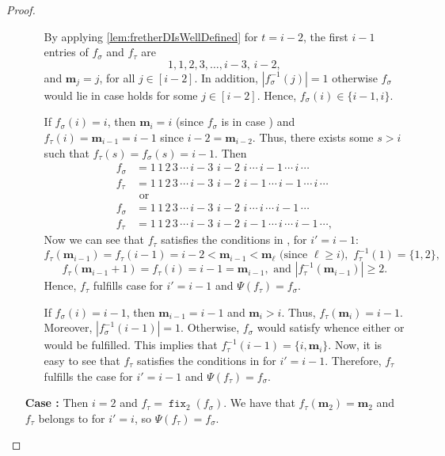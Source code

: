 \documentclass[reqno]{amsart}
\theoremstyle{definition}
\newcommand{\fretherD}{\Psi}
\newcommand{\img}{\mathbf{m}}
\DeclareMathOperator{\fixMap}{\mathtt{fix}}
\begin{document}
\begin{proof}
\begin{enumerate}[leftmargin=1.6cm]
\begin{itemize}[leftmargin=-1cm]
			\medskip
			\noindent
			By applying \cref{lem:fretherDIsWellDefined} for $t=i-2$,  the first $i-1$ entries of $f_\sigma$ and $f_\tau$ are
			\[
			1, 1, 2, 3,\dotsc , i{-}3,\, i{-}2,
			\]
			and $\img_j=j$, for all $j\in[i-2]$. In addition, $|f^{-1}_\sigma(j)|=1$ otherwise $f_\sigma$ would lie in case \caseFour[j] holds for some $j\in[i-2]$. Hence, $f_\sigma(i) \in \{i{-}1,i\}$. 
		
			
			\medskip 
			\noindent 
			If $f_\sigma(i)=i$, then $\img_i=i$ (since $f_\sigma$ is in case \caseOne[i]) and  $f_\tau(i)=\img_{i-1}=i-1$ since $i-2=\img_{i-2}$. 
			Thus, there exists some $s>i$ such that  $f_\tau(s)=f_\sigma(s)=i-1$. Then
			\begin{align*}
				f_\sigma&=1\,1\,2\,3\,\dotsm\,i{-}3\,\,i{-}2\,\,i\,\dotsm\,i{-}1\,\dotsm\,i\,\dotsm\\
				f_\tau&=1\,1\,2\,3\,\dotsm\,i{-}3\,\,i{-}2\,\,i{-}1\,\dotsm\,i{-}1\,\dotsm\,i\,\dotsm\\
				&\text{ or }\\
				f_\sigma&=1\,1\,2\,3\,\dotsm\,i{-}3\,\,i{-}2\,\,i\,\dotsm\,i\,\dotsm\,i{-}1\,\dotsm\\
				f_\tau&=1\,1\,2\,3\,\dotsm\,i{-}3\,\,i{-}2\,\,i{-}1\,\dotsm\,i\,\dotsm\,i{-}1\,\dotsm,
			\end{align*}
		Now we can see that $f_\tau$ satisfies the conditions in \eqCond[i'], for $i'=i-1$:
		\[
		f_\tau(\img_{i-1})=f_\tau(i-1)=i-2<\img_{i-1}<\img_{\ell}\text{ (since $\ell\geq i$)},\,\,
		f^{-1}_\tau(1)=\{1,2\}, \]
		\[f_\tau(\img_{i-1}+1)=
        f_\tau(i)=i-1=\img_{i-1}, \text{ and }
		|f^{-1}_\tau(\img_{i-1})|\geq 2.
		\]
		Hence, $f_\tau$ fulfills case \caseFour[i'] for $i'=i-1$ and $\fretherD(f_\tau)=f_\sigma$.
		
		\medskip
		If $f_\sigma(i)=i-1$, then $\img_{i-1}=i-1$ and $\img_{i}>i$. Thus, $f_\tau(\img_i)=i-1$. Moreover, $|f^{-1}_\sigma(i-1)|=1$. Otherwise, 
		$f_\sigma$ would satisfy \eqCond[i] whence either \caseThree[i] or \caseFour[i] would be fulfilled. This implies that $f^{-1}_\tau(i-1)=\{i, \img_i\}$. Now, it is easy to see that $f_\tau$ satisfies the conditions in \eqCond[i'] for $i'=i-1$. Therefore, $f_\tau$ fulfills the case \caseFour[i'] for $i'=i-1$ and $\fretherD(f_\tau)=f_\sigma$.
		\end{itemize}
		
		\item[\textbf{Case \caseTwo[i]:}] 
		Then $i=2$ and $f_\tau = \fixMap_2(f_\sigma)$.
		We have that $f_\tau(\img_2)=\img_2$ and $f_\tau$ belongs to \caseOne[i'] for $i'=i$,
		so $\fretherD(f_\tau)=f_\sigma$.
		

\end{enumerate}
\end{proof}
\end{document}
